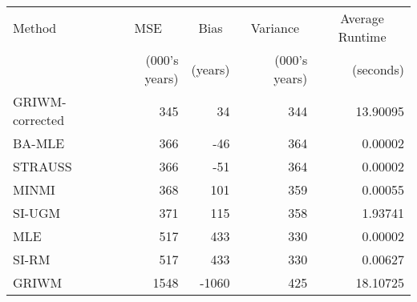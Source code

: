 
\begin{tabular}{lrrrr}
\toprule
\multicolumn{1}{l}{Method} & \multicolumn{1}{c}{MSE} & \multicolumn{1}{c}{Bias} & \multicolumn{1}{c}{Variance} & \multicolumn{1}{c}{Average Runtime} \\
 & (000's years) & (years) & (000's years) & (seconds)\\
\midrule
GRIWM-corrected & 345 & 34 & 344 & 13.90095\\
BA-MLE & 366 & -46 & 364 & 0.00002\\
STRAUSS & 366 & -51 & 364 & 0.00002\\
MINMI & 368 & 101 & 359 & 0.00055\\
SI-UGM & 371 & 115 & 358 & 1.93741\\
\addlinespace
MLE & 517 & 433 & 330 & 0.00002\\
SI-RM & 517 & 433 & 330 & 0.00627\\
GRIWM & 1548 & -1060 & 425 & 18.10725\\
\bottomrule
\end{tabular}
